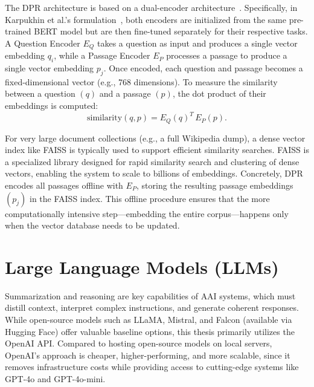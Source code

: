 The DPR architecture is based on a dual-encoder architecture~\cite{dualencoderarchitecture}. Specifically, in Karpukhin et al.'s formulation~\cite{densepassageretrievalopendomainkarpukhin2020}, both encoders are initialized from the same pre-trained BERT model but are then fine-tuned separately for their respective tasks. A Question Encoder \(E_Q\) takes a question as input and produces a single vector embedding \(q_i\), while a Passage Encoder \(E_P\) processes a passage to produce a single vector embedding \(p_j\). Once encoded, each question and passage becomes a fixed-dimensional vector (e.g., 768 dimensions). To measure the similarity between a question \((q)\) and a passage \((p)\), the dot product of their embeddings is computed:
\begin{equation}
    \label{eq:dot_sim}
    \text{similarity}(q, p) = E_Q(q)^T \, E_P(p).
\end{equation}

For very large document collections (e.g., a full Wikipedia dump), a dense vector index like \ac{FAISS} \cite{DOUZE2024FAISS} is typically used to support efficient similarity searches. \ac{FAISS} is a specialized library designed for rapid similarity search and clustering of dense vectors, enabling the system to scale to billions of embeddings. Concretely, DPR encodes all passages offline with \(E_P\), storing the resulting passage embeddings \((p_j)\) in the \ac{FAISS} index. This offline procedure ensures that the more computationally intensive step—embedding the entire corpus—happens only when the vector database needs to be updated.

\section{Large Language Models (LLMs)}
\label{sec:llm}
Summarization and reasoning are key capabilities of \ac{AAI} systems, which must distill context, interpret complex instructions, and generate coherent responses.
While open-source models such as LLaMA, Mistral, and Falcon (available via Hugging Face) offer valuable baseline options, this thesis primarily utilizes the OpenAI API. Compared to hosting open-source models on local servers, OpenAI’s approach is cheaper, higher-performing, and more scalable, since it removes infrastructure costs while providing access to cutting-edge systems like GPT-4o and GPT-4o-mini.

